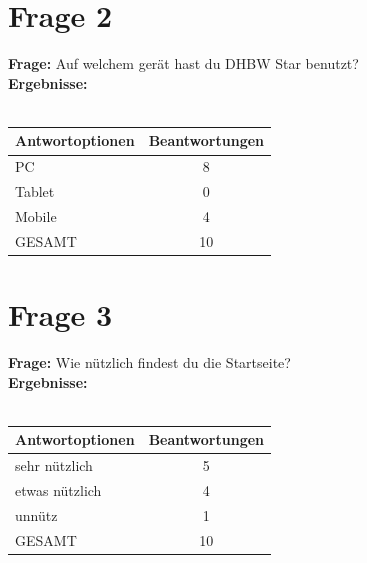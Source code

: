\section{Frage 2 \label{frage02}}
\begin{figure}
	\centering
\end{figure}
\textbf{Frage:} Auf welchem gerät hast du DHBW Star benutzt?\\
\textbf{Ergebnisse:}\\
\\
\begin{tabular}{|l|c|}\hline
	\textbf{Antwortoptionen} & \textbf{Beantwortungen} \\\hline
	PC 			& 8 \\\hline
	Tablet		& 0 \\\hline
	Mobile 		& 4 \\\hline
	GESAMT		& 10 \\\hline			
\end{tabular}

\section{Frage 3 \label{frage03}}
\begin{figure}
	\centering
\end{figure}

\textbf{Frage:} Wie nützlich findest du die Startseite?\\
\textbf{Ergebnisse:}\\
\\
\begin{tabular}{|l|c|}\hline
	\textbf{Antwortoptionen} & \textbf{Beantwortungen} \\\hline
	sehr nützlich  	& 5 \\\hline
	etwas nützlich	& 4 \\\hline
	unnütz 			& 1 \\\hline
	GESAMT			& 10 \\\hline			
\end{tabular}


